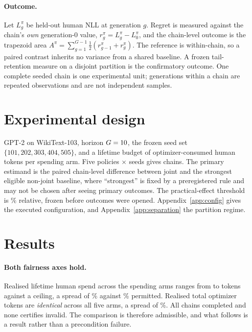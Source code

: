 \documentclass{article}
\begin{document}
\paragraph{Outcome.}
Let $L_g^{\pi}$ be held-out human NLL at generation $g$. Regret is measured against the
chain's \emph{own} generation-0 value, $r_g^{\pi}=L_g^{\pi}-L_0^{\pi}$, and the chain-level
outcome is the trapezoid area $A^{\pi}=\sum_{g=1}^{G-1}\tfrac12(r_{g-1}^{\pi}+r_g^{\pi})$.
The reference is within-chain, so a paired contrast inherits no variance from a shared
baseline. A frozen tail-retention measure on a disjoint partition is the confirmatory
outcome. One complete seeded chain is one experimental unit; generations within a chain are
repeated observations and are not independent samples.

\section{Experimental design}
\label{sec:experiments}

GPT-2 on WikiText-103, horizon $G=10{}$, the frozen seed set
$\{101,202,303,404,505\}$, and a lifetime budget of \PilotCeiling{} optimizer-consumed human
tokens per spending arm. Five policies $\times$ \PilotSeeds{} seeds gives \PilotChains{}
chains. The primary estimand is the paired chain-level difference between joint and the
strongest eligible non-joint baseline, where ``strongest'' is fixed by a preregistered rule
and may not be chosen after seeing primary outcomes. The practical-effect threshold is
\PilotThresholdPct\% relative, frozen before outcomes were opened. Appendix~\ref{app:config}
gives the executed configuration, and Appendix~\ref{app:separation} the partition regime.

\section{Results}
\label{sec:results}

\paragraph{Both fairness axes hold.}
Realised lifetime human spend across the spending arms ranges from \PilotMatchedLow{} to
\PilotMatchedHigh{} tokens against a \PilotCeiling{} ceiling, a spread of
\PilotHumanSpreadPct\% against \PilotSpreadPermittedPct\% permitted. Realised total optimizer
tokens are \emph{identical} across all five arms, a spread of \PilotTotalSpreadExactPct\%.
All \PilotChains{} chains completed and none certifies invalid. The comparison is therefore
admissible, and what follows is a result rather than a precondition failure.
\end{document}
